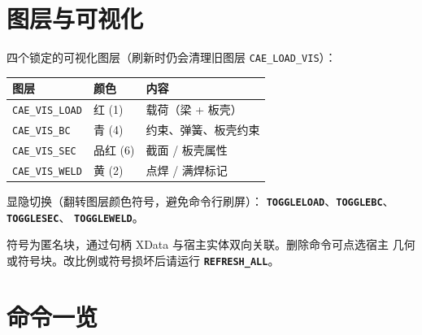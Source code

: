 \documentclass[a4paper]{ltxdoc}
\newcommand{\cadcmd}[1]{\texttt{\textbf{#1}}}
\begin{document}
\section{图层与可视化}

四个锁定的可视化图层（刷新时仍会清理旧图层 \texttt{CAE\_LOAD\_VIS}）：

\begin{center}
\begin{tabular}{@{}lll@{}}
\toprule
图层 & 颜色 & 内容 \\
\midrule
\texttt{CAE\_VIS\_LOAD} & 红 (1)     & 载荷（梁 + 板壳） \\
\texttt{CAE\_VIS\_BC}   & 青 (4)     & 约束、弹簧、板壳约束 \\
\texttt{CAE\_VIS\_SEC}  & 品红 (6)   & 截面 / 板壳属性 \\
\texttt{CAE\_VIS\_WELD} & 黄 (2)     & 点焊 / 满焊标记 \\
\bottomrule
\end{tabular}
\end{center}

显隐切换（翻转图层颜色符号，避免命令行刷屏）：
\cadcmd{TOGGLELOAD}、\cadcmd{TOGGLEBC}、\cadcmd{TOGGLESEC}、
\cadcmd{TOGGLEWELD}。

符号为匿名块，通过句柄 XData 与宿主实体双向关联。删除命令可点选宿主
几何或符号块。改比例或符号损坏后请运行 \cadcmd{REFRESH\_ALL}。

\section{命令一览}
\end{document}
